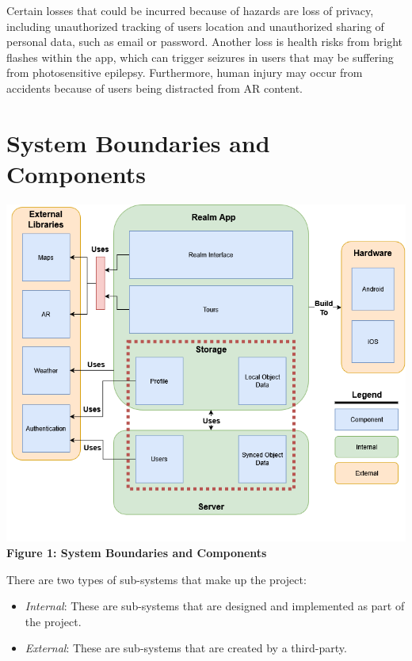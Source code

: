 \documentclass{article}
\begin{document}
Certain losses that could be incurred because of hazards are loss of privacy, including unauthorized tracking of users location and unauthorized sharing of personal data, such as email or password. Another loss is health risks from bright flashes within the app, which can trigger seizures in users that may be suffering from photosensitive epilepsy. Furthermore, human injury may occur from accidents because of users being distracted from AR content.

\section{System Boundaries and Components}

\begin{center}
    \includegraphics[scale=0.5]{sys_bound_comp.png} \\
    \textbf{Figure 1: System Boundaries and Components}
\end{center}

There are two types of sub-systems that make up the project:
\begin{itemize}
    \item \emph{Internal}: These are sub-systems that are designed and implemented as part of the project.
    \item \emph{External}: These are sub-systems that are created by a third-party.
\end{itemize}
\end{document}

